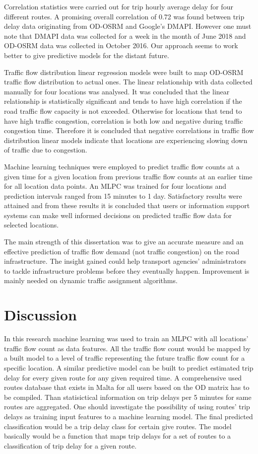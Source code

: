 \documentclass[12pt, a4paper]{report}
\theoremstyle{definition}
\theoremstyle{definition}%
\theoremstyle{definition}%
\theoremstyle{definition}%
\theoremstyle{definition}%
\theoremstyle{definition}%
\begin{document}
Correlation statistics were carried out for trip hourly average delay for four different routes. A promising overall correlation of 0.72 was found between trip delay data originating from OD-OSRM and Google's DMAPI. However one must note that DMAPI data was collected for a week in the month of June 2018 and OD-OSRM data was collected in October 2016. Our approach seems to work better to give predictive models for the distant future.

Traffic flow distribution linear regression models were built to map OD-OSRM traffic flow distribution to actual ones. The linear relationship with data collected manually for four locations was analysed. It was concluded that the linear relationship is statistically significant and tends to have high correlation if the road traffic flow capacity is not exceeded. Otherwise for locations that tend to have high traffic congestion, correlation is both low and negative during traffic congestion time. Therefore it is concluded that negative correlations in traffic flow distribution linear models indicate that locations are experiencing slowing down of traffic due to congestion.

Machine learning techniques were employed to predict traffic flow counts at a given time for a given location from previous traffic flow counts at an earlier time for all location data points. An MLPC was trained for four locations and prediction intervals ranged from 15 minutes to 1 day. Satisfactory results were attained and from these results it is concluded that users or information support systems can make well informed decisions on predicted traffic flow data for selected locations.

The main strength of this dissertation was to give an accurate measure and an effective prediction of traffic flow demand (not traffic congestion) on the road infrastructure. The insight gained could help transport agencies' administrators to tackle infrastructure problems before they eventually happen. Improvement is mainly needed on dynamic traffic assignment algorithms.

\section{Discussion} \label{discussion}

In this research machine learning was used to train an MLPC with all locations' traffic flow count as data features. All the traffic flow count would be mapped by a built model to a level of traffic representing the future traffic flow count for a specific location. A similar predictive model can be built to predict estimated trip delay for every given route for any given required time. A comprehensive used routes database that exists in Malta for all users based on the OD matrix has to be compiled. Than statisictical information on trip delays per 5 minutes for same routes are aggregated. One should investigate the possibility of using routes' trip delays as training input features to a machine learning model. The final predicted classification would be a trip delay class for certain give routes. The model basically would be a function that maps trip delays for a set of routes to a classification of trip delay for a given route.
\end{document}
